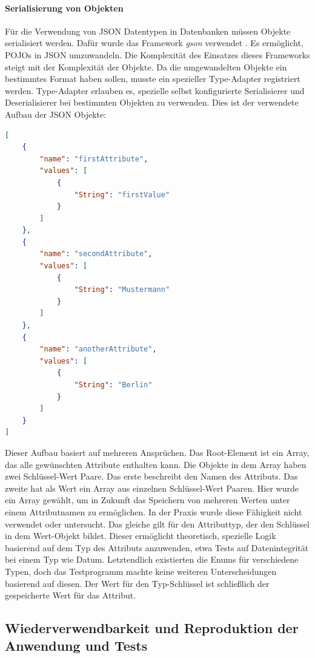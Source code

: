 \label{ppar:Serialisierung}
\paragraph{Serialisierung von Objekten}

Für die Verwendung von JSON Datentypen in Datenbanken müssen Objekte serialisiert werden. Dafür wurde das Framework \textit{gson} verwendet \cite{GitHub.05.07.2021}. Es ermöglicht, \ac{POJO}s in JSON umzuwandeln. Die Komplexität des Einsatzes dieses Frameworks steigt mit der Komplexität der Objekte. Da die umgewandelten Objekte ein bestimmtes Format haben sollen, musste ein spezieller Type-Adapter registriert werden. Type-Adapter erlauben es, spezielle selbst konfigurierte Serialisierer und Deserialisierer bei bestimmten Objekten zu verwenden.
Dies ist der verwendete Aufbau der JSON Objekte:

\begin{lstlisting}[language=json,caption={Attribute-JSON}]
[
    {
        "name": "firstAttribute",
        "values": [
            {
                "String": "firstValue"
            }
        ]
    },
    {
        "name": "secondAttribute",
        "values": [
            {
                "String": "Mustermann"
            }
        ]
    },
    {
        "name": "anotherAttribute",
        "values": [
            {
                "String": "Berlin"
            }
        ]
    }
]
\end{lstlisting}

Dieser Aufbau basiert auf mehreren Ansprüchen. Das Root-Element ist ein Array, das alle gewünschten Attribute enthalten kann. Die Objekte in dem Array haben zwei Schlüssel-Wert Paare. Das erste beschreibt den Namen des Attributs. Das zweite hat als Wert ein Array aus einzelnen Schlüssel-Wert Paaren. Hier wurde ein Array gewählt, um in Zukunft das Speichern von mehreren Werten unter einem Attributnamen zu ermöglichen. In der Praxis wurde diese Fähigkeit nicht verwendet oder untersucht. Das gleiche gilt für den Attributtyp, der den Schlüssel in dem Wert-Objekt bildet. Dieser ermöglicht theoretisch, spezielle Logik basierend auf dem Typ des Attributs anzuwenden, etwa Tests auf Datenintegrität bei einem Typ wie Datum. Letztendlich existierten die Enums für verschiedene Typen, doch das Testprogramm machte keine weiteren Unterscheidungen basierend auf diesen. Der Wert für den Typ-Schlüssel ist schließlich der gespeicherte Wert für das Attribut.

\subsection{Wiederverwendbarkeit und Reproduktion der Anwendung und Tests}

